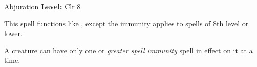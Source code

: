 {Abjuration}
{
	\textbf{Level:}
	Clr 8\\
}
{
	This spell functions like , except the immunity applies to spells of 8th level or lower.

	A creature can have only one  or \emph{greater spell immunity} spell in effect on it at a time.

}
